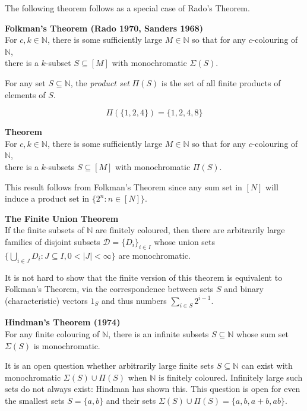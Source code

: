 \documentclass[a4paper]{article}
\let\oldendproof\endproof
\renewenvironment{proof}[1][\proofname]{%
  \oldproof[\scshape \noindent {\bfseries \text{Proof}}]%
}{\oldendproof}
\newcommand{\example} {\bigskip\noindent{\bf Example.}\;\;}
\newcommand{\definition}{\bigskip\noindent{\bf Definition.}\;\;}
\newenvironment{thm}[1]{
	\begin{framed}
	\noindent
	{\bfseries #1}\\}{
	\end{framed}
}
\begin{document}
The following theorem follows as a special case of Rado's Theorem.
	
\begin{thm}{Folkman's Theorem (Rado 1970, Sanders 1968)}
For $c,k \in \mathbb{N}$,
there is some sufficiently large $M \in \mathbb{N}$ so that for
any $c$-colouring of $\mathbb{N}$,\\
there is a $k$-subset $S\subseteq [M]$ with monochromatic $\Sigma(S)$.
\end{thm}

\definition
For any set $S \subseteq \mathbb{N}$,
the \emph{product set} $\Pi(S)$ is the set of all finite products of elements of $S$.

\example
\[ \Pi (\{1,2,4\}) = \{1,2,4,8\}\]

\begin{thm}{Theorem}
For $c,k \in \mathbb{N}$, there is some sufficiently large $M \in \mathbb{N}$
so that for any $c$-colouring of $\mathbb{N}$,\\
there is a $k$-subsets $S \subseteq [M]$ with monochromatic $\Pi(S)$.
\end{thm}

\begin{proof}
This result follows from Folkman's Theorem
since any sum set in $[N]$ will induce a product set in $\{2^n : n \in [N]\}$.
\end{proof}

\newpage

\begin{thm}{The Finite Union Theorem}
If the finite subsets of $\mathbb{N}$ are finitely coloured,
then there are arbitrarily large families of disjoint subsets $\mathcal{D} = \{D_i\}_{i \in I}$
whose union sets $\{ \bigcup_{i \in J} D_i : J \subseteq I, 0 < |J| < \infty\}$ are monochromatic.
\end{thm}

It is not hard to show that
the finite version of this theorem is equivalent to Folkman's Theorem,
via the correspondence between sets $S$ and binary (characteristic) vectors $1_S$
and thus numbers $\sum_{i \in S} 2^{i-1}$.

\begin{thm}{Hindman's Theorem (1974)}
For any finite colouring of $\mathbb{N}$,
there is an infinite subsets $S \subseteq \mathbb{N}$
whose sum set $\Sigma(S)$ is monochromatic.
\end{thm}

It is an open question whether arbitrarily large finite sets $S \subseteq \mathbb{N}$
can exist with monochromatic $\Sigma(S) \cup \Pi(S)$ when $\mathbb{N}$ is finitely coloured.
Infinitely large such sets do not always exist: Hindman has shown this.
This question is open for even the smallest sets $S = \{a,b\}$
and their sets $\Sigma(S) \cup \Pi(S) = \{a,b,a+b,ab\}$.
\end{document}
